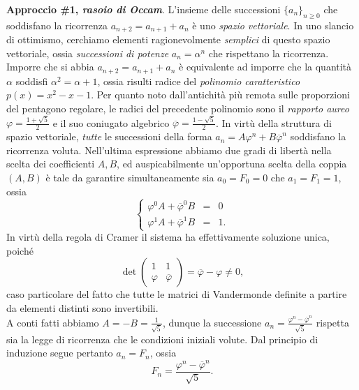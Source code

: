 \documentclass[a4paper,twoside]{article}
\theoremstyle{definition}
\numberwithin{theorem}{section}
\begin{document}
\textbf{Approccio \#1, \emph{rasoio di Occam}}. L'insieme delle successioni $\{a_n\}_{n\geq 0}$ che soddisfano la ricorrenza $a_{n+2}=a_{n+1}+a_n$ è uno \emph{spazio vettoriale}. In uno slancio di ottimismo, cerchiamo elementi ragionevolmente \emph{semplici} di questo spazio vettoriale, ossia \emph{successioni di potenze} $a_n=\alpha^n$ che rispettano la ricorrenza.
Imporre che si abbia $a_{n+2}=a_{n+1}+a_n$ è equivalente ad imporre che la quantità $\alpha$ soddisfi $\alpha^2=\alpha+1$, ossia risulti radice del \emph{polinomio caratteristico} $p(x)=x^2-x-1$. Per quanto noto dall'antichità più remota sulle proporzioni del pentagono regolare, le radici del precedente polinomio sono il \emph{rapporto aureo} $\varphi=\frac{1+\sqrt{5}}{2}$ e il suo coniugato algebrico $\overline{\varphi}=\frac{1-\sqrt{5}}{2}$. In virtù della struttura di spazio vettoriale, \emph{tutte} le successioni della forma $a_n = A\varphi^n + B\overline{\varphi}^n$ soddisfano la ricorrenza voluta. Nell'ultima espressione abbiamo due gradi di libertà nella scelta dei coefficienti $A,B$, ed auspicabilmente un'opportuna scelta della coppia $(A,B)$ è tale da garantire simultaneamente sia $a_0=F_0=0$ che $a_1=F_1=1$, ossia 
$$ \left\{\begin{array}{rcl}\varphi^0 A + \overline{\varphi}^0 B &=& 0 \\ \varphi^1 A + \overline{\varphi}^1 B &=& 1.\end{array}\right. $$
In virtù della regola di Cramer il sistema ha effettivamente soluzione unica, poiché 
$$ \det \begin{pmatrix} 1 & 1 \\ \varphi & \overline{\varphi} \end{pmatrix}=\overline{\varphi}-\varphi \neq 0, $$
caso particolare del fatto che tutte le matrici di Vandermonde definite a partire da elementi distinti sono invertibili.\\
A conti fatti abbiamo $A=-B=\frac{1}{\sqrt{5}}$, dunque la successione $a_n=\frac{\varphi^n-\overline{\varphi}^n}{\sqrt{5}}$ rispetta sia la legge di ricorrenza che le condizioni iniziali volute. Dal principio di induzione segue pertanto $a_n=F_n$, ossia 
$$ F_n = \frac{\varphi^n-\overline{\varphi}^n}{\sqrt{5}}. $$
\end{document}
